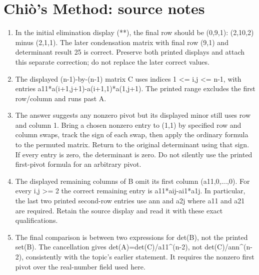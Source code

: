 \section*{Chiò’s Method: source notes}
\begin{enumerate}
\item In the initial elimination display (**), the final row should be (0,9,1): (2,10,2) minus (2,1,1). The later condensation matrix with final row (9,1) and determinant result 25 is correct. Preserve both printed displays and attach this separate correction; do not replace the later correct values.
\item The displayed (n-1)-by-(n-1) matrix C uses indices 1 <= i,j <= n-1, with entries a11*a(i+1,j+1)-a(i+1,1)*a(1,j+1). The printed range excludes the first row/column and runs past A.
\item The answer suggests any nonzero pivot but its displayed minor still uses row and column 1. Bring a chosen nonzero entry to (1,1) by specified row and column swaps, track the sign of each swap, then apply the ordinary formula to the permuted matrix. Return to the original determinant using that sign. If every entry is zero, the determinant is zero. Do not silently use the printed first-pivot formula for an arbitrary pivot.
\item The displayed remaining columns of B omit its first column (a11,0,...,0). For every i,j >= 2 the correct remaining entry is a11*aij-ai1*a1j. In particular, the last two printed second-row entries use ann and a2j where a11 and a21 are required. Retain the source display and read it with these exact qualifications.
\item The final comparison is between two expressions for det(B), not the printed set(B). The cancellation gives det(A)=det(C)/a11\textasciicircum{}(n-2), not det(C)/ann\textasciicircum{}(n-2), consistently with the topic's earlier statement. It requires the nonzero first pivot over the real-number field used here.
\end{enumerate}
